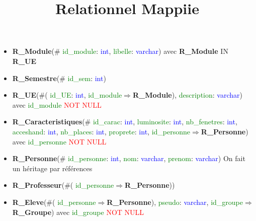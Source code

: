 \documentclass{article}
\title{Relationnel Mappiie}
\begin{document}
\maketitle

\begin{itemize}

\item \textbf{R\_Module}(\#\textcolor{green}{ id\_module}: \textcolor{blue}{ int}, \textcolor{green}{ libelle}: \textcolor{blue}{ varchar}) avec \textbf{R\_Module} IN \textbf{R\_UE}\\

\item \textbf{R\_Semestre}(\#\textcolor{green}{ id\_sem}: \textcolor{blue}{ int})\\

\item \textbf{R\_UE}(\#(\textcolor{green}{ id\_UE}: \textcolor{blue}{ int}, \textcolor{green}{ id\_module}$\Rightarrow$\textbf{R\_Module}), \textcolor{green}{ description}: \textcolor{blue}{ varchar}) avec \textcolor{green}{ id\_module} \textcolor{red}{NOT NULL}\\

\item \textbf{R\_Caracteristiques}(\#\textcolor{green}{ id\_carac}: \textcolor{blue}{ int}, \textcolor{green}{ luminosite}: \textcolor{blue}{ int}, \textcolor{green}{ nb\_fenetres}: \textcolor{blue}{ int}, \textcolor{green}{ acceshand}: \textcolor{blue}{ int}, \textcolor{green}{ nb\_places}: \textcolor{blue}{ int}, \textcolor{green}{ proprete}: \textcolor{blue}{ int},\textcolor{green}{  id\_personne}$\Rightarrow$\textbf{R\_Personne}) avec \textcolor{green}{ id\_personne} \textcolor{red}{NOT NULL} \\

\item \textbf{R\_Personne}(\#\textcolor{green}{ id\_personne}: \textcolor{blue}{ int}, \textcolor{green}{ nom}: \textcolor{blue}{ varchar}, \textcolor{green}{ prenom}: \textcolor{blue}{ varchar})       On fait un héritage par références\\

\item \textbf{R\_Professeur}(\#(\textcolor{green}{ id\_personne}$\Rightarrow$\textbf{R\_Personne}))\\

\item \textbf{R\_Eleve}(\#(\textcolor{green}{ id\_personne}$\Rightarrow$\textbf{R\_Personne}), \textcolor{green}{ pseudo}: \textcolor{blue}{ varchar},\textcolor{green}{ id\_groupe}$\Rightarrow$\textbf{R\_Groupe}) avec \textcolor{green}{  id\_groupe} \textcolor{red}{NOT NULL} \\


\end{itemize}
\end{document}
